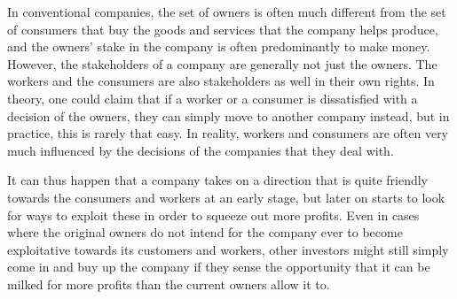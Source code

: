 \documentclass{article}
\begin{document}
In conventional companies, the set of owners is often much different from the set of consumers that buy the goods and services that the company helps produce, and the owners' stake in the company is often predominantly to make money. However, the stakeholders of a company are generally not just the owners. The workers and the consumers are also stakeholders as well in their own rights.
In theory, one could claim that if a worker or a consumer is dissatisfied with a decision of the owners, they can simply move to another company instead, but in practice, this is rarely that easy. In reality, workers and consumers are often very much influenced by the decisions of the companies that they deal with. 
%

It can thus happen that a company takes on a direction that is quite friendly towards the consumers and workers at an early stage, but later on starts to look for ways to exploit these in order to squeeze out more profits. Even in cases where the original owners do not intend for the company ever to become exploitative towards its customers and workers, other investors might still simply come in and buy up the company if they sense the opportunity that it can be milked for more profits than the current owners allow it to. %
\end{document}
